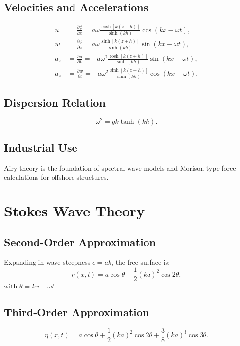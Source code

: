 \documentclass[11pt,a4paper]{article}
\begin{document}
\subsection{Velocities and Accelerations}
\begin{align}
u &= \frac{\partial \phi}{\partial x} = a\omega \frac{\cosh[k(z+h)]}{\sinh(kh)} \cos(kx - \omega t), \\
w &= \frac{\partial \phi}{\partial z} = a\omega \frac{\sinh[k(z+h)]}{\sinh(kh)} \sin(kx - \omega t), \\
a_x &= \frac{\partial u}{\partial t} = -a\omega^2 \frac{\cosh[k(z+h)]}{\sinh(kh)} \sin(kx - \omega t), \\
a_z &= \frac{\partial w}{\partial t} = -a\omega^2 \frac{\sinh[k(z+h)]}{\sinh(kh)} \cos(kx - \omega t).
\end{align}
\subsection{Dispersion Relation}
\begin{equation}
\omega^2 = gk \tanh(kh).
\end{equation}

\subsection{Industrial Use}
Airy theory is the foundation of spectral wave models and Morison-type force calculations for offshore structures.

\section{Stokes Wave Theory}
\subsection{Second-Order Approximation}
Expanding in wave steepness $\epsilon = ak$, the free surface is:
\begin{equation}
\eta(x,t) = a \cos\theta + \frac{1}{2}(ka)^2 \cos 2\theta,
\end{equation}
with $\theta = kx - \omega t$.

\subsection{Third-Order Approximation}
\begin{equation}
\eta(x,t) = a\cos\theta + \frac{1}{2}(ka)^2\cos 2\theta + \frac{3}{8}(ka)^3\cos 3\theta.
\end{equation}
\end{document}
